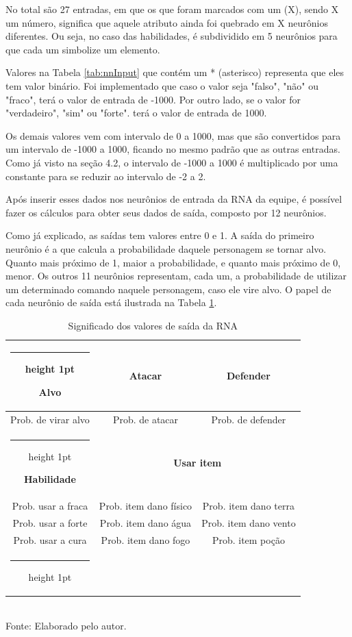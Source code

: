 \documentclass[
	12pt,					%
	openright,				%
	oneside,				%
	a4paper,				%
	bibjustif,				%
	chapter=TITLE,			%
	english,				%
	brazil,					%
	]{abntex2}
\makeatletter
\newcommand{\thickhline}{%
    	\noalign {\ifnum 0=`}\fi \hrule height 1pt
    	\futurelet \reserved@a \@xhline
	}
\newcommand{\source}[1]{\small Fonte: {#1}}
\makeatother
\begin{document}
	No total são 27 entradas,
	em que os que foram marcados com um (X), sendo X um número,
	significa que aquele atributo ainda foi quebrado em X neurônios diferentes.
	Ou seja, no caso das habilidades,
	é subdividido em 5 neurônios para que cada um simbolize um elemento.
	
	Valores na Tabela \ref{tab:nnInput} que contém um * (asterisco) representa que eles tem valor binário.
	Foi implementado que caso o valor seja "falso"{}, "não"{} ou "fraco"{}, terá o valor de entrada de -1000.
	Por outro lado, se o valor for "verdadeiro"{}, "sim"{} ou "forte"{}. terá o valor de entrada de 1000.
	
	Os demais valores vem com intervalo de 0 a 1000,
	mas que são convertidos para um intervalo de -1000 a 1000,
	ficando no mesmo padrão que as outras entradas.
	Como já visto na seção 4.2,
	o intervalo de -1000 a 1000 é multiplicado por uma constante para se reduzir ao intervalo de -2 a 2.
	
	Após inserir esses dados nos neurônios de entrada da RNA da equipe,
	é possível fazer os cálculos para obter seus dados de saída,
	composto por 12 neurônios.
	
	Como já explicado, as saídas tem valores entre 0 e 1.
	A saída do primeiro neurônio é a que calcula a probabilidade daquele personagem se tornar alvo.
	Quanto mais próximo de 1, maior a probabilidade,
	e quanto mais próximo de 0, menor.
	Os outros 11 neurônios representam, cada um, a probabilidade de utilizar um determinado comando naquele personagem, caso ele vire alvo.
	O papel de cada neurônio de saída está ilustrada na Tabela \ref{tab:nnOutput}.
	
	\begin{table}[h]
		\caption{Significado dos valores de saída da RNA}
		\centering
		\small
		\renewcommand{\arraystretch}{1.2} %
		\begin{tabular}{c|c|c}
			\thickhline 
			\textbf{Alvo}				& \textbf{Atacar}						& \textbf{Defender}				\\\hline
			Prob. de virar alvo			& Prob. de atacar						& Prob. de defender				\\\thickhline
			\textbf{Habilidade}			& 					\multicolumn{2}{c}{\textbf{Usar item}}				\\\hline
			Prob. usar a fraca			& Prob. item dano físico				& Prob. item dano terra			\\ 
			Prob. usar a forte			& Prob. item dano água					& Prob. item dano vento			\\ 
			Prob. usar a cura			& Prob. item dano fogo					& Prob. item poção				\\\thickhline
		\end{tabular}\\
		\vspace{3mm}
		\source{Elaborado pelo autor.}
		\label{tab:nnOutput}
	\end{table}
	
\end{document}
